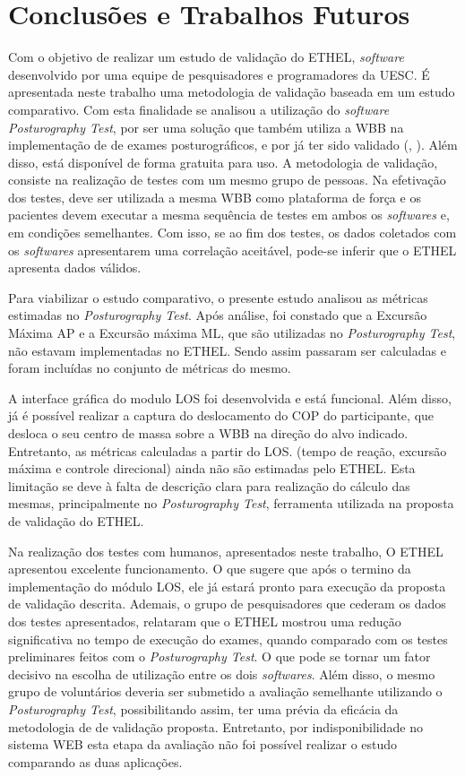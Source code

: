 \chapter{Conclusões e Trabalhos Futuros}

Com o objetivo de realizar um estudo de validação do ETHEL, \textit{software} desenvolvido por uma equipe de pesquisadores e programadores da UESC. É apresentada neste trabalho uma metodologia de validação baseada em um estudo comparativo. Com esta finalidade se analisou a utilização do \textit{software} \textit{Posturography Test}, por ser uma solução que também utiliza a WBB na implementação de de exames posturográficos, e por já ter sido validado (\citeauthor{llorens2016posturography}, \citeyear{llorens2016posturography}). Além disso, está disponível de forma gratuita para uso. A metodologia  de validação, consiste na realização de testes com um mesmo grupo de pessoas. Na efetivação dos testes, deve ser utilizada a mesma WBB como plataforma de força e os pacientes devem executar a mesma sequência de testes em ambos os \textit{softwares} e, em condições semelhantes. Com isso, se ao fim dos testes, os dados coletados com os \textit{softwares} apresentarem uma correlação aceitável, pode-se inferir que o ETHEL apresenta dados válidos. 

Para viabilizar o estudo comparativo, o presente estudo  analisou as métricas estimadas no \textit{Posturography Test}. Após análise, foi constado que a Excursão Máxima AP e a Excursão máxima ML, que são utilizadas no \textit{Posturography Test}, não estavam implementadas no ETHEL. Sendo assim passaram ser calculadas e foram incluídas no conjunto de métricas do mesmo. 

A interface gráfica do modulo LOS foi desenvolvida e está funcional. Além disso, já é possível realizar a captura do deslocamento do COP do participante, que desloca o seu centro de massa sobre a WBB na direção do alvo indicado. Entretanto, as métricas calculadas a partir do LOS. (tempo de reação, excursão máxima e controle direcional) ainda não são estimadas pelo ETHEL. Esta limitação se deve à falta de descrição clara para realização do cálculo das mesmas, principalmente no \textit{Posturography Test}, ferramenta utilizada na proposta de validação do ETHEL.

Na realização dos testes com humanos, apresentados neste trabalho, O ETHEL apresentou excelente funcionamento. O que sugere que após o termino da implementação do módulo LOS, ele já estará pronto para execução da proposta de validação descrita. Ademais, o grupo de pesquisadores que cederam os dados dos testes apresentados, relataram que o ETHEL mostrou uma redução significativa no tempo de execução do exames, quando comparado com os testes preliminares feitos com o \textit{Posturography Test}. O que pode se tornar um fator decisivo na escolha de utilização entre os dois \textit{softwares}. Além disso, o mesmo grupo de voluntários deveria ser submetido a avaliação semelhante utilizando o \textit{Posturography Test}, possibilitando assim, ter uma prévia da eficácia da metodologia de de validação proposta. Entretanto, por indisponibilidade no sistema WEB esta etapa da avaliação não foi possível realizar o estudo comparando as duas aplicações. 

